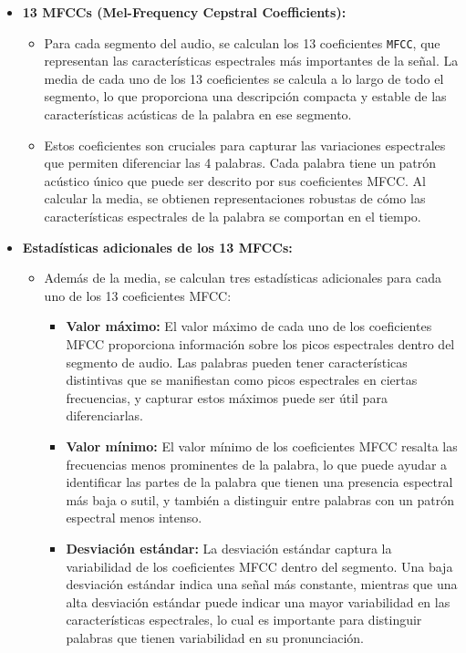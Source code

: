 \documentclass[12pt,a4paper]{article}
\begin{document}
\begin{itemize}

\item \textbf{13 MFCCs (Mel-Frequency Cepstral Coefficients):}
  \begin{itemize}
    \item Para cada segmento del audio, se calculan los 13 coeficientes \texttt{MFCC}, que representan las características espectrales más importantes de la señal. La media de cada uno de los 13 coeficientes se calcula a lo largo de todo el segmento, lo que proporciona una descripción compacta y estable de las características acústicas de la palabra en ese segmento. 
    \item Estos coeficientes son cruciales para capturar las variaciones espectrales que permiten diferenciar las 4 palabras. Cada palabra tiene un patrón acústico único que puede ser descrito por sus coeficientes MFCC. Al calcular la media, se obtienen representaciones robustas de cómo las características espectrales de la palabra se comportan en el tiempo.
  \end{itemize}

\item \textbf{Estadísticas adicionales de los 13 MFCCs:}
  \begin{itemize}
    \item Además de la media, se calculan tres estadísticas adicionales para cada uno de los 13 coeficientes MFCC:
      \begin{itemize}
        \item \textbf{Valor máximo:} El valor máximo de cada uno de los coeficientes MFCC proporciona información sobre los picos espectrales dentro del segmento de audio. Las palabras pueden tener características distintivas que se manifiestan como picos espectrales en ciertas frecuencias, y capturar estos máximos puede ser útil para diferenciarlas.
        \item \textbf{Valor mínimo:} El valor mínimo de los coeficientes MFCC resalta las frecuencias menos prominentes de la palabra, lo que puede ayudar a identificar las partes de la palabra que tienen una presencia espectral más baja o sutil, y también a distinguir entre palabras con un patrón espectral menos intenso.
        \item \textbf{Desviación estándar:} La desviación estándar captura la variabilidad de los coeficientes MFCC dentro del segmento. Una baja desviación estándar indica una señal más constante, mientras que una alta desviación estándar puede indicar una mayor variabilidad en las características espectrales, lo cual es importante para distinguir palabras que tienen variabilidad en su pronunciación.
      \end{itemize}
  \end{itemize}


\end{itemize}
\end{document}
